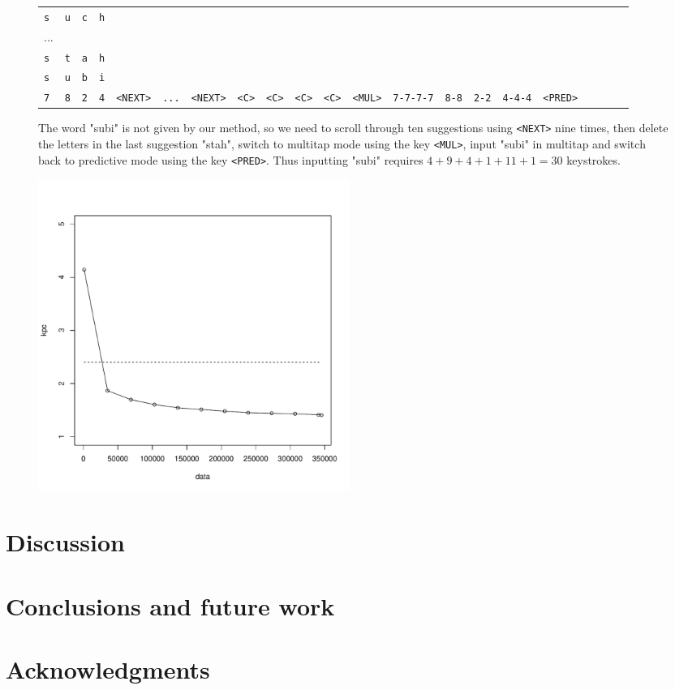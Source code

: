 \documentclass{llncs}
\begin{document}
\begin{figure}[htb!]
\begin{center}
\begin{tabular}{lllllllllllllllllllll}
\texttt{s} & \texttt{u} & \texttt{c} & \texttt{h}\\
...\\
\texttt{s} & \texttt{t} & \texttt{a} & \texttt{h}\\
\texttt{s} & \texttt{u} & \texttt{b} & \texttt{i}\\    
\texttt{7} & \texttt{8} & \texttt{2} & \texttt{4} & \texttt{<NEXT>} & \texttt{...} & \texttt{<NEXT>} & \texttt{<C>} & \texttt{<C>} & \texttt{<C>} & \texttt{<C>} & \texttt{<MUL>} & \texttt{7-7-7-7} & \texttt{8-8} & \texttt{2-2} & \texttt{4-4-4} & \texttt{<PRED>}
\end{tabular}

\caption{The word "subi" is not given by our method, so we need to scroll through ten suggestions using \texttt{<NEXT>} nine times, then delete the letters in the last suggestion "stah", switch to multitap mode using the key \texttt{<MUL>}, input "subi" in multitap and switch back to predictive mode using the key \texttt{<PRED>}. Thus inputting "subi" requires $4 + 9 + 4 + 1 + 11 + 1 = 30$ keystrokes.} \label{new-method-kpc-unknown}
\end{center}
\end{figure}



\begin{figure}[hbt!]
\includegraphics[width=4in]{finnish_kpc_figure.pdf}
\end{figure}

\section{Discussion}\label{discussion}

\section{Conclusions and future work}\label{conclusion}

\section{Acknowledgments}



\end{document}

